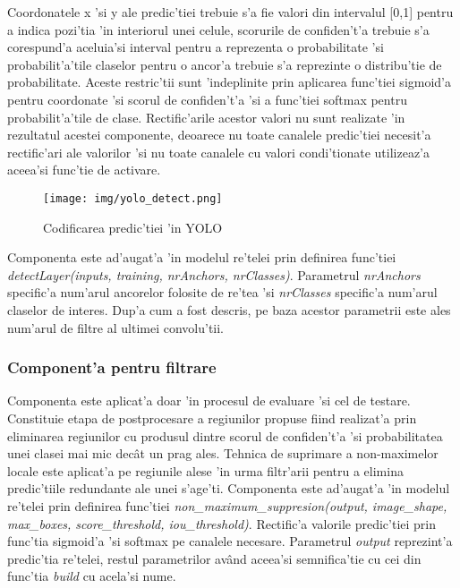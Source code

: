 \documentclass[12pt,a4paper,twoside]{report}
\begin{document}
Coordonatele x 'si y ale predic'tiei trebuie s'a fie valori din intervalul [0,1] pentru a indica pozi'tia 'in interiorul unei celule, scorurile de confiden't'a trebuie s'a corespund'a aceluia'si interval pentru a reprezenta o probabilitate 'si probabilit'a'tile claselor pentru o ancor'a trebuie s'a reprezinte o distribu'tie de probabilitate. Aceste restric'tii sunt 'indeplinite prin aplicarea func'tiei sigmoid'a pentru coordonate 'si scorul de confiden't'a 'si a func'tiei softmax pentru probabilit'a'tile de clase. Rectific'arile acestor valori nu sunt realizate 'in rezultatul acestei componente, deoarece nu toate canalele predic'tiei necesit'a rectific'ari ale valorilor 'si nu toate canalele cu valori condi'tionate utilizeaz'a aceea'si func'tie de activare. 

\begin{figure}[H]
  \centering
  \texttt{[image: img/yolo\_detect.png]}
  \caption{Codificarea predic'tiei 'in YOLO \protect \footnotemark}
  \label{fig:yolo_detect}
\end{figure}

Componenta este ad'augat'a 'in modelul re'telei prin definirea func'tiei \textit{detectLayer(inputs, training, nrAnchors, nrClasses)}. Parametrul \textit{nrAnchors} specific'a num'arul ancorelor folosite de re'tea 'si \textit{nrClasses} specific'a num'arul claselor de interes. Dup'a cum a fost descris, pe baza acestor parametrii este ales num'arul de filtre al ultimei convolu'tii.

\subsubsection{Component'a pentru filtrare}
Componenta este aplicat'a doar 'in procesul de evaluare 'si cel de testare. Constituie etapa de postprocesare a regiunilor propuse fiind realizat'a prin eliminarea regiunilor cu produsul dintre scorul de confiden't'a 'si probabilitatea unei clasei mai mic dec\^at un prag ales. Tehnica de suprimare a non-maximelor locale este aplicat'a pe regiunile alese 'in urma filtr'arii pentru a elimina predic'tiile redundante ale unei s'age'ti. Componenta este ad'augat'a 'in modelul re'telei prin definirea func'tiei \textit{non\_maximum\_suppresion(output, image\_shape, max\_boxes, score\_threshold, iou\_threshold)}. Rectific'a valorile predic'tiei prin func'tia sigmoid'a 'si softmax pe canalele necesare. Parametrul \textit{output} reprezint'a predic'tia re'telei, restul parametrilor av\^and aceea'si semnifica'tie cu cei din func'tia \textit{build} cu acela'si nume.
\end{document}
